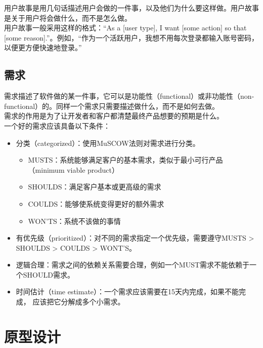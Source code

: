 用户故事是用几句话描述用户会做的一件事，以及他们为什么要这样做。用户故事是关于用户将会做什么，而不是怎么做。\\

用户故事一般采用这样的格式：“As a [user type], I want [some action] so that [some reason].”。例如，“作为一个活跃用户，我想不用每次登录都输入账号密码，以便更方便快速地登录。”\\

\subsection{需求}

需求描述了软件做的某一件事，它可以是功能性（functional）或非功能性（non-functional）的。同样一个需求只需要描述做什么，而不是如何去做。\\

需求的作用是为了让开发者和客户都清楚最终产品想要的预期是什么。\\

一个好的需求应该具备以下条件：

\begin{itemize}
    \item 分类（categorized）：使用MuSCOW法则对需求进行分类。
          \begin{itemize}
              \item MUSTS：系统能够满足客户的基本需求，类似于最小可行产品（minimum viable product）
              \item SHOULDS：满足客户基本或更高级的需求
              \item COULDS：能够使系统变得更好的额外需求
              \item WON'TS：系统不该做的事情
          \end{itemize}

    \item 有优先级（prioritized）：对不同的需求指定一个优先级，需要遵守MUSTS > SHOULDS > COULDS > WONT'S。

    \item 逻辑合理：需求之间的依赖关系需要合理，例如一个MUST需求不能依赖于一个SHOULD需求。

    \item 时间估计（time estimate）：一个需求应该需要在15天内完成，如果不能完成， 应该把它分解成多个小需求。
\end{itemize}

\newpage

\section{原型设计}

